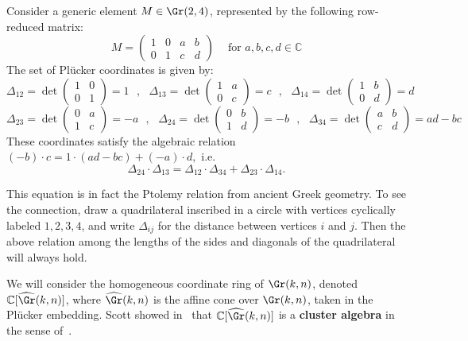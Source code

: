 \begin{exam}\label{example:pluckerrelations}
Consider a generic element $M \in \Gr(2,4)$, represented by the following row-reduced matrix:
$$M = \begin{pmatrix}
1 & 0 & a & b\\
0 & 1 & c & d
\end{pmatrix}~~~~\text{ for } a,b,c,d \in \mathbb{C}$$
The set of Pl\"ucker coordinates is given by:
$$\Delta_{12} = \det \begin{pmatrix}
1 & 0\\
0 & 1
\end{pmatrix} = 1~~~,~~~\Delta_{13} = \det \begin{pmatrix}
1 & a\\
0 & c
\end{pmatrix} = c~~~,~~~\Delta_{14} = \det \begin{pmatrix}
1 & b\\
0 & d
\end{pmatrix} = d$$
$$\Delta_{23} = \det \begin{pmatrix}
0 & a\\
1 & c
\end{pmatrix} = -a~~~,~~~\Delta_{24} = \det \begin{pmatrix}
0 & b\\
1 & d
\end{pmatrix} = -b~~~,~~~\Delta_{34} = \det \begin{pmatrix}
a & b\\
c & d
\end{pmatrix} = ad-bc$$
These coordinates satisfy the algebraic relation
$(-b) \cdot c = 1 \cdot (ad-bc) + (-a) \cdot d,$
i.e.
\[\Delta_{24} \cdot \Delta_{13} = \Delta_{12} \cdot \Delta_{34}+ \Delta_{23} \cdot \Delta_{14}.\]

This equation is in fact the Ptolemy relation from ancient Greek geometry. To see the connection, draw a quadrilateral inscribed in a circle with vertices cyclically labeled $1,2,3,4$, and write $\Delta_{ij}$ for the distance between vertices $i$ and $j$. Then the above relation among the lengths of the sides and diagonals of the quadrilateral will always hold. 
\end{exam}

We will consider the homogeneous coordinate ring of $\Gr(k,n)$, denoted $\mathbb{C}[\widehat{\Gr}(k,n)]$,
where $\widehat\Gr(k,n)$ is the affine cone over $\Gr(k,n)$, taken in the Pl\"ucker embedding. Scott showed in~\cite{s06} that $\mathbb{C}[\widehat{\Gr}(k,n)]$ is a \textbf{cluster algebra} in the sense of~\cite{fz02}.

